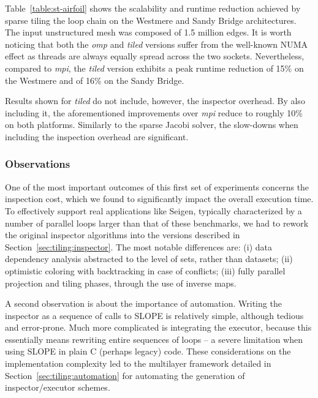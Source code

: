 
Table~\ref{table:st-airfoil} shows the scalability and runtime reduction achieved by sparse tiling the loop chain on the Westmere and Sandy Bridge architectures. The input unstructured mesh was composed of 1.5 million edges. It is worth noticing that both the {\em omp} and {\em tiled} versions suffer from the well-known NUMA effect as threads are always equally spread across the two sockets. Nevertheless, compared to {\em mpi}, the {\em tiled} version exhibits a peak runtime reduction of 15\% on the Westmere and of 16\% on the Sandy Bridge. 

Results shown for {\em tiled} do not include, however, the inspector overhead. By also including it, the aforementioned improvements over {\em mpi} reduce to roughly 10\% on both platforms. Similarly to the sparse Jacobi solver, the slow-downs when including the inspection overhead are significant.


\subsubsection{Observations}
\label{sec:tiling:bench:conc}
One of the most important outcomes of this first set of experiments concerns the inspection cost, which we found to significantly impact the overall execution time. To effectively support real applications like Seigen, typically characterized by a number of parallel loops larger than that of these benchmarks, we had to rework the original inspector algorithms into the versions described in Section~\ref{sec:tiling:inspector}. The most notable differences are: (i) data dependency analysis abstracted to the level of sets, rather than datasets; (ii) optimistic coloring with backtracking in case of conflicts; (iii) fully parallel projection and tiling phases, through the use of inverse maps. 

A second observation is about the importance of automation. Writing the inspector as a sequence of calls to SLOPE is relatively simple, although tedious and error-prone. Much more complicated is integrating the executor, because this essentially means rewriting entire sequences of loops -- a severe limitation when using SLOPE in plain C (perhaps legacy) code. These considerations on the implementation complexity led to the multilayer framework detailed in Section~\ref{sec:tiling:automation} for automating the generation of inspector/executor schemes. 

